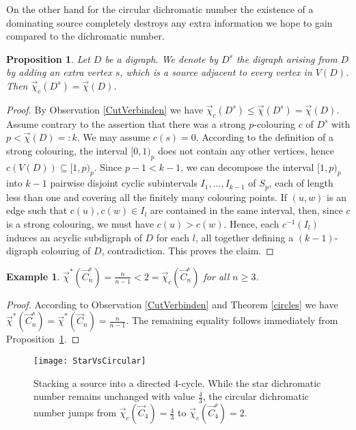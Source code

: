 \documentclass[fontsize=11pt,a4paper,DIV12]{scrartcl}
\theoremstyle{meiner}
\newtheorem{proposition}{Proposition}
\newtheorem{example}{Example}
\theoremstyle{definition}
\begin{document}
On the other hand for the circular dichromatic number the existence of
a dominating source completely destroys any extra information we hope to 
gain compared to the dichromatic number.
\begin{proposition}\label{prop:dominating}
  Let $D$ be a digraph. We denote by $D^s$ the digraph arising from
  $D$ by adding an extra vertex $s$, which is a source adjacent to
  every vertex in $V(D)$. Then $\vec{\chi}_c(D^s)=\vec{\chi}(D)$.
\end{proposition}
\begin{proof}
  By Observation \ref{CutVerbinden} we have $\vec{\chi}_c(D^s) \leq
  \vec{\chi}(D^s)=\vec{\chi}(D)$. Assume contrary to the assertion
  that there was a strong $p$-colouring $c$ of $D^s$ with
  $p<\vec{\chi}(D)=:k$. We may assume $c(s)=0$. According to the
  definition of a strong colouring, the interval $[0,1)_p$ does not
  contain any other vertices, hence $c(V(D)) \subseteq [1,p)_p$. Since
  $p-1<k-1$, we can decompose the interval $[1,p)_p$ into $k-1$
  pairwise disjoint cyclic subintervals $I_1,...,I_{k-1}$ of $S_p$,
  each of length less than one and covering all the finitely many
  colouring points. If $(u,w)$ is an edge such that $c(u),c(w) \in I_l$
  are contained in the same interval, then, since $c$ is a strong
  colouring, we must have $c(u)>c(w)$. Hence, each $c^{-1}(I_l)$ induces an
  acyclic subdigraph of $D$ for each $l$, all together defining a
  $(k-1)$-digraph colouring of $D$, contradiction.  This proves the
  claim.
\end{proof}

\begin{example} \label{ex}
$\vec{\chi}^\ast(\vec{C}_n^s)=\frac{n}{n-1}<2=\vec{\chi}_c(\vec{C}_n^s)$ for all $n \ge 3$.
\end{example}
\begin{proof}

  According to Observation \ref{CutVerbinden} and Theorem
  \ref{circles} we have $\vec{\chi}^\ast(\vec{C}_n^s) =
  \vec{\chi}^\ast(\vec{C}_n)=\frac{n}{n-1}$. The remaining equality follows
  immediately from Proposition~\ref{prop:dominating}.
\end{proof}
\begin{figure}
\centering
\texttt{[image: StarVsCircular]}
\caption{Stacking a source into a directed 4-cycle. While the star dichromatic number remains unchanged with value $\frac{4}{3}$, the circular dichromatic number jumps from $\vec{\chi}_c(\vec{C}_4)=\frac{4}{3}$ to $\vec{\chi}_c(\vec{C}_4^s)=2$.} \label{DQ}
\end{figure}
\end{document}
